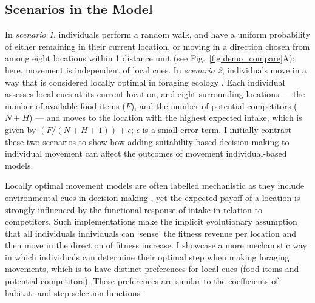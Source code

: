 \begin{interludeenv}
\subsection*{Scenarios in the Model}

In \textit{scenario 1}, individuals perform a random walk, and have a uniform probability of either remaining in their current location, or moving in a direction chosen from among eight locations within 1 distance unit (see Fig.~\ref{fig:demo_compare}A); here, movement is independent of local cues.
In \textit{scenario 2}, individuals move in a way that is considered locally optimal in foraging ecology \citep{stephens2019,scherer2020}.
Each individual assesses local cues at its current location, and eight surrounding locations --- the number of available food items ($F$), and the number of potential competitors ($N + H$) --- and moves to the location with the highest expected intake, which is given by $(F / (N + H + 1)) + \epsilon$; $\epsilon$ is a small error term.
I initially contrast these two scenarios to show how adding suitability-based decision making to individual movement can affect the outcomes of movement individual-based models.

Locally optimal movement models are often labelled mechanistic as they include environmental cues in decision making \citep[e.g.][]{scherer2020}, yet the expected payoff of a location is strongly influenced by the functional response of intake in relation to competitors.
Such implementations make the implicit evolutionary assumption that all individuals individuals can `sense' the fitness revenue per location and then move in the direction of fitness increase.
I showcase a more mechanistic way in which individuals can determine their optimal step when making foraging movements, which is to have distinct preferences for local cues (food items and potential competitors).
These preferences are similar to the coefficients of habitat- and step-selection functions \citep[][]{fortin2005,thurfjell2014,manly2002}.


\end{interludeenv}
